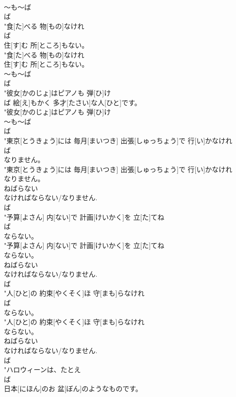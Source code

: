 \documentclass[8pt]{extreport}
\begin{document}
\begin{CJK}{UTF8}{min}
\\	～も～ば 
\\	ば
\\	"食[た]べる 物[もの]なけれ
\\	ば
\\	住[す]む 所[ところ]もない。
\\	"食[た]べる 物[もの]なけれ
\\	住[す]む 所[ところ]もない。
\\	～も～ば 
\\	ば
\\	"彼女[かのじょ]はピアノも 弾[ひ]け
\\	ば 絵[え]もかく 多才[たさい]な人[ひと]です。
\\	"彼女[かのじょ]はピアノも 弾[ひ]け
\\	～も～ば 
\\	ば
\\	"東京[とうきょう]には 毎月[まいつき] 出張[しゅっちょう]で 行[い]かなけれ
\\	ば
\\	なりません。
\\	"東京[とうきょう]には 毎月[まいつき] 出張[しゅっちょう]で 行[い]かなけれ
\\	なりません。
\\	ねばらない 
\\	なければならない/なりません.	
\\	ば
\\	"予算[よさん] 内[ない]で 計画[けいかく]を 立[た]てね
\\	ば
\\	ならない。
\\	"予算[よさん] 内[ない]で 計画[けいかく]を 立[た]てね
\\	ならない。
\\	ねばらない 
\\	なければならない/なりません.	
\\	ば
\\	"人[ひと]の 約束[やくそく]ほ 守[まも]らなけれ
\\	ば
\\	ならない。
\\	"人[ひと]の 約束[やくそく]ほ 守[まも]らなけれ
\\	ならない。
\\	ねばらない 
\\	なければならない/なりません.	
\\	ば
\\	"ハロウィーンは、たとえ
\\	ば
\\	日本[にほん]のお 盆[ぼん]のようなものです。

\end{CJK}
\end{document}
